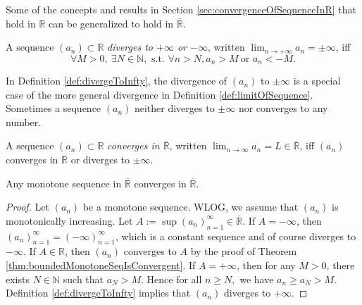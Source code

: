\begin{rem}
  Some of the concepts and results in Section
  \ref{sec:convergenceOfSequenceInR}
  that hold in $\mathbb{R}$
  can be generalized to hold in $\overline{\mathbb{R}}$. 
\end{rem}

\begin{defn}
  \label{def:divergeToInfty}
  A sequence $(a_n)\subset \mathbb{R}$
  \emph{diverges to $+\infty$ or $-\infty$},
  written $\lim_{n\rightarrow +\infty} a_n = \pm \infty$,
  iff
  \begin{equation}
    \label{eq:divergeToInfty}
    \forall M>0,\ \exists N\in \mathbb{N},\text{ s.t. }
    \forall n>N, a_{n}>M\ \text{or }a_{n}<-M.
  \end{equation}
\end{defn}

\begin{rem}
  In Definition \ref{def:divergeToInfty},
  the divergence of $(a_n)$ to $\pm \infty$
  is a special case of the more general divergence
  in Definition \ref{def:limitOfSequence}. 
  Sometimes a sequence $(a_n)$ neither diverges to $\pm \infty$
  nor converges to any number.  
\end{rem}

\begin{defn}
  \label{def:limitOfSequenceInRclosure}
  A sequence $(a_n)\subset \mathbb{R}$
  \emph{converges in $\overline{\mathbb{R}}$},
  written $\lim_{n\rightarrow \infty} a_n = L\in \overline{\mathbb{R}}$,
  iff $(a_{n})$ converges in $\mathbb{R}$ or
  diverges to $\pm \infty$. 
\end{defn}

\begin{thm}
  \label{thm:monotoneSubsequenceInR*}
  Any monotone sequence in $\overline{\mathbb{R}}$ converges in $\overline{\mathbb{R}}$.
\end{thm}
\begin{proof}
  Let $(a_{n})$ be a monotone sequence.
  WLOG, we assume that $(a_{n})$ is monotonically increasing.
  Let $A:=\sup(a_{n})_{n=1}^{\infty}\in \overline{\mathbb{R}}. $
  If $A=-\infty$, then $(a_{n})_{n=1}^{\infty}=(-\infty)_{n=1}^{\infty}$,
  which is a constant sequence and of course diverges to $-\infty$.
  If $A\in \mathbb{R}$, then $(a_{n})$ converges to $A$ by the proof of
  Theorem \ref{thm:boundedMonotoneSeqIsConvergent}.
  If $A=+\infty$, then for any $M>0$,
  there exists $N\in \mathbb{N}$ such that $a_{N}>M$.
  Hence for all $n\ge N,$ we have $a_{n}\ge a_{N}>M$.
  Definition \ref{def:divergeToInfty} implies
  that $(a_{n})$ diverges to $+\infty$.
\end{proof}


